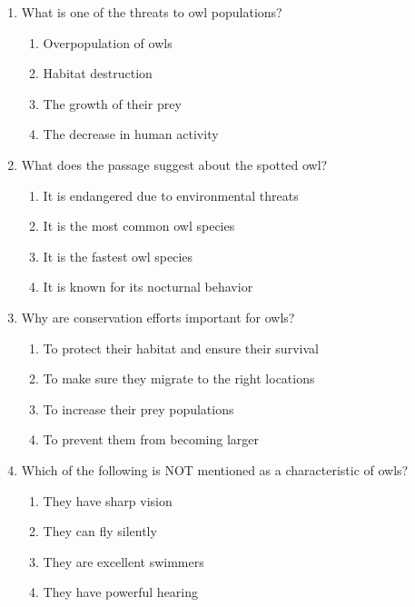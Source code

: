 \documentclass[12pt]{article}
\begin{document}
\begin{enumerate}
\vspace{0.5cm}

\item What is one of the threats to owl populations?
\begin{enumerate}[label=\Alph*.]
    \item Overpopulation of owls
    \item Habitat destruction
    \item The growth of their prey
    \item The decrease in human activity
\end{enumerate}

\vspace{0.5cm}

\item What does the passage suggest about the spotted owl?
\begin{enumerate}[label=\Alph*.]
    \item It is endangered due to environmental threats
    \item It is the most common owl species
    \item It is the fastest owl species
    \item It is known for its nocturnal behavior
\end{enumerate}

\vspace{0.5cm}

\item Why are conservation efforts important for owls?
\begin{enumerate}[label=\Alph*.]
    \item To protect their habitat and ensure their survival
    \item To make sure they migrate to the right locations
    \item To increase their prey populations
    \item To prevent them from becoming larger
\end{enumerate}

\vspace{0.5cm}

\item Which of the following is NOT mentioned as a characteristic of owls?
\begin{enumerate}[label=\Alph*.]
    \item They have sharp vision
    \item They can fly silently
    \item They are excellent swimmers
    \item They have powerful hearing
\end{enumerate}


\end{enumerate}
\end{document}
